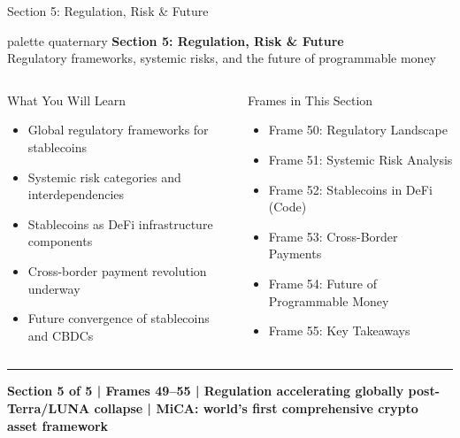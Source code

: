 \documentclass[8pt,aspectratio=169]{beamer}
\newcommand{\bottomnote}[1]{\vfill\vspace{-2mm}\textcolor{mllavender2}{\rule{\textwidth}{0.4pt}}\vspace{1mm}\footnotesize\textbf{#1}}
\begin{document}
\begin{frame}{Section 5: Regulation, Risk \& Future}
\begin{beamercolorbox}[sep=12pt,center,rounded=true,shadow=true]{palette quaternary}
  {\Large\bfseries Section 5: Regulation, Risk \& Future}\\[4pt]
  {\normalsize Regulatory frameworks, systemic risks, and the future of programmable money}
\end{beamercolorbox}

\vspace{4mm}
\begin{columns}[T]
\begin{block}{What You Will Learn}
\begin{itemize}\setlength{\itemsep}{2pt}
  \item Global regulatory frameworks for stablecoins
  \item Systemic risk categories and interdependencies
  \item Stablecoins as DeFi infrastructure components
  \item Cross-border payment revolution underway
  \item Future convergence of stablecoins and CBDCs
\end{itemize}
\end{block}
\begin{block}{Frames in This Section}
\begin{itemize}\setlength{\itemsep}{2pt}
  \item Frame 50: Regulatory Landscape
  \item Frame 51: Systemic Risk Analysis
  \item Frame 52: Stablecoins in DeFi (Code)
  \item Frame 53: Cross-Border Payments
  \item Frame 54: Future of Programmable Money
  \item Frame 55: Key Takeaways
\end{itemize}
\end{block}
\end{columns}
\bottomnote{Section 5 of 5 | Frames 49--55 | Regulation accelerating globally post-Terra/LUNA collapse | MiCA: world's first comprehensive crypto asset framework}
\end{frame}
\end{document}
